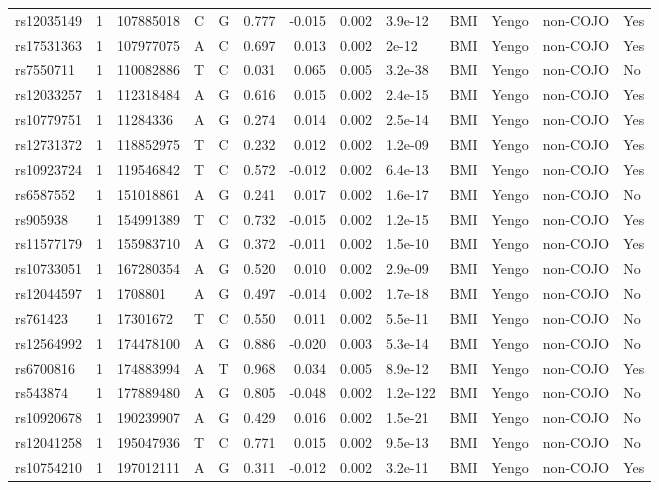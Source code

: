 \documentclass[11pt,twoside]{bristolthesis}
\begin{document}
\begin{longtable}[t]{lrlllrrrlllll}
rs12035149 & 1 & 107885018 & C & G & 0.777 & -0.015 & 0.002 & 3.9e-12 & BMI & Yengo & non-COJO & Yes\\
rs17531363 & 1 & 107977075 & A & C & 0.697 & 0.013 & 0.002 & 2e-12 & BMI & Yengo & non-COJO & Yes\\
rs7550711 & 1 & 110082886 & T & C & 0.031 & 0.065 & 0.005 & 3.2e-38 & BMI & Yengo & non-COJO & No\\
\addlinespace
rs12033257 & 1 & 112318484 & A & G & 0.616 & 0.015 & 0.002 & 2.4e-15 & BMI & Yengo & non-COJO & Yes\\
rs10779751 & 1 & 11284336 & A & G & 0.274 & 0.014 & 0.002 & 2.5e-14 & BMI & Yengo & non-COJO & Yes\\
rs12731372 & 1 & 118852975 & T & C & 0.232 & 0.012 & 0.002 & 1.2e-09 & BMI & Yengo & non-COJO & Yes\\
rs10923724 & 1 & 119546842 & T & C & 0.572 & -0.012 & 0.002 & 6.4e-13 & BMI & Yengo & non-COJO & Yes\\
rs6587552 & 1 & 151018861 & A & G & 0.241 & 0.017 & 0.002 & 1.6e-17 & BMI & Yengo & non-COJO & No\\
\addlinespace
rs905938 & 1 & 154991389 & T & C & 0.732 & -0.015 & 0.002 & 1.2e-15 & BMI & Yengo & non-COJO & Yes\\
rs11577179 & 1 & 155983710 & A & G & 0.372 & -0.011 & 0.002 & 1.5e-10 & BMI & Yengo & non-COJO & Yes\\
rs10733051 & 1 & 167280354 & A & G & 0.520 & 0.010 & 0.002 & 2.9e-09 & BMI & Yengo & non-COJO & No\\
rs12044597 & 1 & 1708801 & A & G & 0.497 & -0.014 & 0.002 & 1.7e-18 & BMI & Yengo & non-COJO & No\\
rs761423 & 1 & 17301672 & T & C & 0.550 & 0.011 & 0.002 & 5.5e-11 & BMI & Yengo & non-COJO & No\\
\addlinespace
rs12564992 & 1 & 174478100 & A & G & 0.886 & -0.020 & 0.003 & 5.3e-14 & BMI & Yengo & non-COJO & No\\
rs6700816 & 1 & 174883994 & A & T & 0.968 & 0.034 & 0.005 & 8.9e-12 & BMI & Yengo & non-COJO & Yes\\
rs543874 & 1 & 177889480 & A & G & 0.805 & -0.048 & 0.002 & 1.2e-122 & BMI & Yengo & non-COJO & No\\
rs10920678 & 1 & 190239907 & A & G & 0.429 & 0.016 & 0.002 & 1.5e-21 & BMI & Yengo & non-COJO & No\\
rs12041258 & 1 & 195047936 & T & C & 0.771 & 0.015 & 0.002 & 9.5e-13 & BMI & Yengo & non-COJO & No\\
\addlinespace
rs10754210 & 1 & 197012111 & A & G & 0.311 & -0.012 & 0.002 & 3.2e-11 & BMI & Yengo & non-COJO & Yes\\

\end{longtable}
\end{document}

